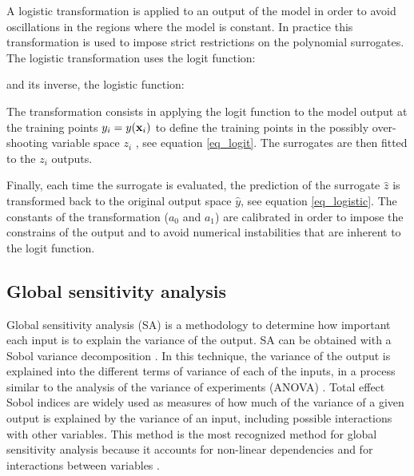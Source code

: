 \documentclass[preprint,12pt]{elsarticle}
\begin{document}
A logistic transformation is applied to an output of the model in order to avoid oscillations in the regions where the model is constant. In practice this transformation is used to impose strict restrictions on the polynomial surrogates. The logistic transformation uses the logit function:


\noindent and its inverse, the logistic function:


The transformation consists in applying the logit function to the model output at the training points $y_i=y(\mathbf{x}_i)$ to define the training points in the possibly over-shooting variable space $z_i$ \cite{simard1998transformation}, see equation \ref{eq_logit}. The surrogates are then fitted to the $z_i$ outputs.


Finally, each time the surrogate is evaluated, the prediction of the surrogate $\hat{z}$ is transformed back to the original output space $\hat{y}$, see equation \ref{eq_logistic}. The constants of the transformation ($a_0$ and $a_1$) are calibrated in order to impose the constrains of the output and to avoid numerical instabilities that are inherent to the logit function.



\subsection{Global sensitivity analysis}

Global sensitivity analysis (SA) is a methodology to determine how important each input is to explain the variance of the output. SA can be obtained with a Sobol variance decomposition \cite{sobol2001global}. In this technique, the variance of the output is explained into the different terms of variance of each of the inputs, in a process similar to the analysis of the variance of experiments (ANOVA) \cite{maxwell2004designing}. Total effect Sobol indices are widely used as measures of how much of the variance of a given output is explained by the variance of an input, including possible interactions with other variables. This method is the most recognized method for global sensitivity analysis because it accounts for non-linear dependencies and for interactions between variables \cite{saltelli2010variance}.
\end{document}

